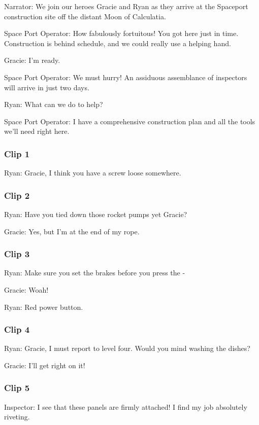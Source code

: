 Narrator: We join our heroes Gracie and Ryan as they arrive at the Spaceport construction site off the distant Moon of Calculatia.

Space Port Operator: How fabulously fortuitous! You got here just in time. Construction is behind schedule, and we could really use a helping hand.

Gracie: I'm ready.

Space Port Operator: We must hurry! An assiduous assemblance of inspectors will arrive in just two days.

Ryan: What can we do to help?

Space Port Operator: I have a comprehensive construction plan and all the tools we'll need right here.

\subsubsection{Clip 1}

Ryan: Gracie, I think you have a screw loose somewhere.

\subsubsection{Clip 2}

Ryan: Have you tied down those rocket pumps yet Gracie?

Gracie: Yes, but I'm at the end of my rope.

\subsubsection{Clip 3}

Ryan: Make sure you set the brakes before you press the -

Gracie: Woah!

Ryan: Red power button.

\subsubsection{Clip 4}

Ryan: Gracie, I must report to level four. Would you mind washing the dishes?

Gracie: I'll get right on it!

\subsubsection{Clip 5}

Inspector: I see that these panels are firmly attached! I find my job absolutely riveting.

